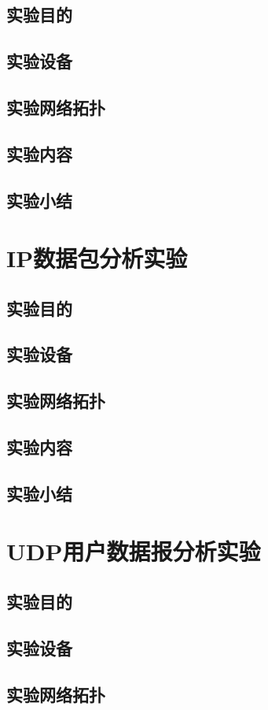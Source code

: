 \documentclass[lang=cn,11pt,a4paper,cite=authoryear]{elegantpaper}
\begin{document}
\subsection{实验目的}
\subsection{实验设备}
\subsection{实验网络拓扑}
\subsection{实验内容}
\subsection{实验小结}
\section{IP数据包分析实验}
\subsection{实验目的}
\subsection{实验设备}
\subsection{实验网络拓扑}
\subsection{实验内容}
\subsection{实验小结}
\section{UDP用户数据报分析实验}
\subsection{实验目的}
\subsection{实验设备}
\subsection{实验网络拓扑}
\end{document}
